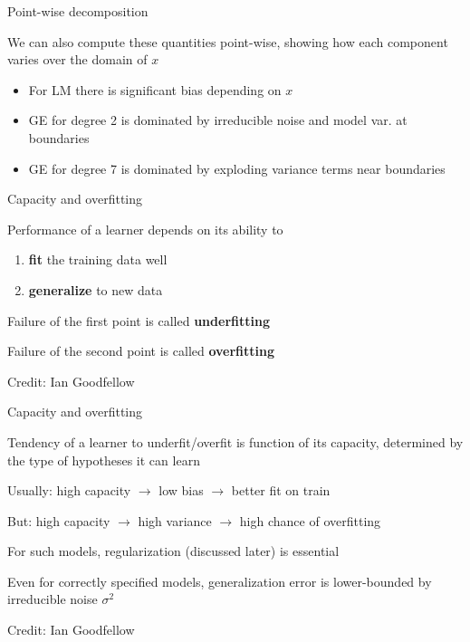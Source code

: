 \documentclass[11pt,compress,t,notes=noshow, xcolor=table]{beamer}
\begin{document}
\begin{frame}{Point-wise decomposition}

We can also compute these quantities point-wise, showing how each component varies over the domain of $x$

\vfill

\splitVThree
{}
{}
{}

\vfill

\begin{itemize}
\item For LM there is significant bias depending on $x$
\item GE for degree 2 is dominated by irreducible noise and model var. at boundaries
\item GE for degree 7 is dominated by exploding variance terms near boundaries
\end{itemize}


\end{frame}

\begin{framei}[sep=L]{Capacity and overfitting}

\item Performance of a learner depends on its ability to 
\begin{enumerate}
\item \textbf{fit} the training data well
\item \textbf{generalize} to new data
\end{enumerate}  
\item Failure of the first point is called \textbf{underfitting}
\item Failure of the second point is called \textbf{overfitting}

\tiny \centering
Credit: Ian Goodfellow

\end{framei}

\begin{framei}[sep=M]{Capacity and overfitting}

\item Tendency of a learner to underfit/overfit is function of its capacity, determined by the type of hypotheses it can learn
\item Usually: high capacity $\rightarrow$ low bias $\rightarrow$ better fit on train
\item But: high capacity $\rightarrow$ high variance $\rightarrow$ high chance of overfitting
\item For such models, regularization (discussed later) is essential
\item Even for correctly specified models, generalization error is lower-bounded by irreducible noise $\sigma^2$

\tiny \centering
Credit: Ian Goodfellow

\end{framei}

\endlecture
\end{document}
